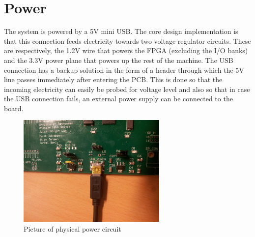 \documentclass[../main/report.tex]{subfiles}
\begin{document}
\section{Power}

The system is powered by a 5V mini USB.
The core design implementation is that this connection feeds electricity towards two voltage regulator circuits.
These are respectively, the 1.2V wire that powers the FPGA (excluding the I/O banks) and the 3.3V power plane that powers up the rest of the machine.
The USB connection has a backup solution in the form of a header through which the 5V line passes immediately after entering the PCB.
This is done so that the incoming electricity can easily be probed for voltage level and also so that in case the USB connection fails, an external power supply can be connected to the board.

\begin{figure}[H]
	\centering
	\includegraphics[width=0.65\textwidth]{../pcb/assets/power.jpg}
	\caption{Picture of physical power circuit}
	\label{fig: power picture}
\end{figure}
\end{document}
